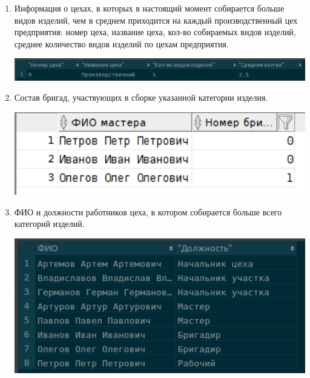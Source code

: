 \begin{enumerate}
    \item Информация о цехах, в которых в настоящий момент собирается больше видов изделий, чем в среднем приходится на каждый производственный цех предприятия: номер цеха, название цеха, кол-во собираемых видов изделий, среднее количество видов изделий по цехам предприятия.

    

    \includegraphics[width=14cm]{./screenshots/results/result8.png}

    \item Состав бригад, участвующих в сборке указанной категории изделия.

    

    \includegraphics[width=14cm]{./screenshots/results/result9.png}

    \item ФИО и должности работников цеха, в котором собирается больше всего категорий изделий.

    

    \includegraphics[width=14cm]{./screenshots/results/result10.png}

\end{enumerate}

